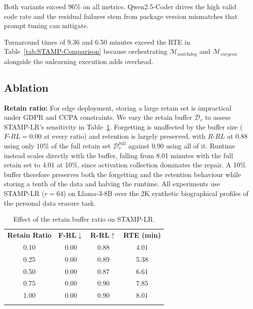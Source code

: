 Both variants exceed 96\% on all metrics. Qwen2.5-Coder drives the high valid code rate and the residual failures stem from package version mismatches that prompt tuning can mitigate.

Turnaround times of 9.36 and 6.50 minutes exceed the RTE in Table~\ref{tab:STAMP-Comparison} because orchestrating $\mathcal{M}_{\textit{watchdog}}$ and $\mathcal{M}_{\textit{surgeon}}$ alongside the unlearning execution adds overhead.

\subsection{Ablation}
\noindent

\textbf{Retain ratio:}
For edge deployment, storing a large retain set is impractical under GDPR and CCPA constraints. We vary the retain buffer $\mathcal{D}_r$ to assess STAMP-LR's sensitivity in Table~\ref{tab:retain_ratio}. Forgetting is unaffected by the buffer size ($F\text{-}RL = 0.00$ at every ratio) and retention is largely preserved, with $R\text{-}RL$ at 0.88 using only 10\% of the full retain set $\mathcal{D}_r^{\mathrm{full}}$ against 0.90 using all of it. Runtime instead scales directly with the buffer, falling from 8.01 minutes with the full retain set to 4.01 at 10\%, since activation collection dominates the repair. A 10\% buffer therefore preserves both the forgetting and the retention behaviour while storing a tenth of the data and halving the runtime. All experiments use STAMP-LR ($r = 64$) on Llama-3-8B over the 2K synthetic biographical profiles of the personal data erasure task.

\begin{table}[H]
\centering
\caption{Effect of the retain buffer ratio on STAMP-LR.}
\label{tab:retain_ratio}
\small
\renewcommand{\arraystretch}{1.3}
\begin{tabular}{c|ccc}
\Xhline{1.15pt}
\textbf{Retain Ratio} & \textbf{F-RL}$\downarrow$ & \textbf{R-RL}$\uparrow$ & \textbf{RTE (min)} \\
\Xhline{1.15pt}
0.10 & 0.00 & 0.88 & 4.01 \\
\rowcolor{gray!15}
0.25 & 0.00 & 0.89 & 5.38 \\
0.50 & 0.00 & 0.87 & 6.61 \\
\rowcolor{gray!15}
0.75 & 0.00 & 0.90 & 7.85 \\
1.00 & 0.00 & 0.90 & 8.01 \\
\Xhline{1.15pt}
\end{tabular}
\end{table}

